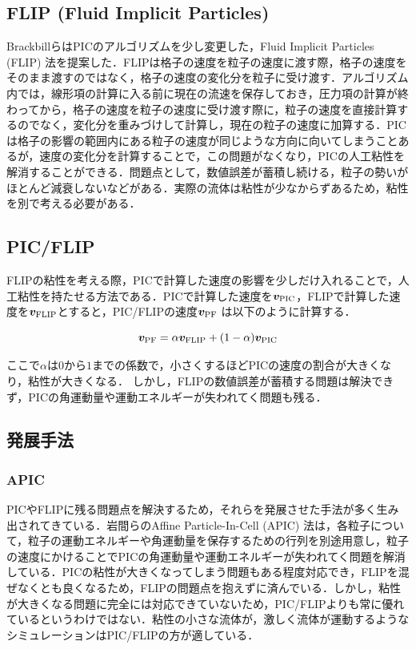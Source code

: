 \documentclass[a4j,12pt]{jreport}
\begin{document}
\subsection{FLIP (Fluid Implicit Particles) } \label{subsec:FLIP}
BrackbillらはPICのアルゴリズムを少し変更した，Fluid Implicit Particles (FLIP) 法\cite{FLIP}を提案した．FLIPは格子の速度を粒子の速度に渡す際，格子の速度をそのまま渡すのではなく，格子の速度の変化分を粒子に受け渡す．アルゴリズム内では，線形項の計算に入る前に現在の流速を保存しておき，圧力項の計算が終わってから，格子の速度を粒子の速度に受け渡す際に，粒子の速度を直接計算するのでなく，変化分を重みづけして計算し，現在の粒子の速度に加算する．PICは格子の影響の範囲内にある粒子の速度が同じような方向に向いてしまうことあるが，速度の変化分を計算することで，この問題がなくなり，PICの人工粘性を解消することができる．問題点として，数値誤差が蓄積し続ける，粒子の勢いがほとんど減衰しないなどがある．実際の流体は粘性が少なからずあるため，粘性を別で考える必要がある．
\subsection{PIC/FLIP} \label{subsec:PIC/FLIP}
FLIPの粘性を考える際，PICで計算した速度の影響を少しだけ入れることで，人工粘性を持たせる方法である．PICで計算した速度を$\bm{v}_{\rm{PIC}}$，FLIPで計算した速度を$\bm{v}_{\rm{FLIP}}$とすると，PIC/FLIPの速度$\bm{v}_{\rm{PF}}$ は以下のように計算する．

\begin{equation}\label{eq:PIC/FLIP}
\bm{v}_{\rm{PF}} =\alpha \bm{v}_{\rm{FLIP}} + (1-\alpha)  \bm{v}_{\rm{PIC}}
\end{equation} 

ここで$\alpha$は$0$から$1$までの係数で，小さくするほどPICの速度の割合が大きくなり，粘性が大きくなる．
しかし，FLIPの数値誤差が蓄積する問題は解決できず，PICの角運動量や運動エネルギーが失われてく問題も残る．

\subsection{発展手法} \label{subsec:APIC/ASFLIP}
\subsubsection{APIC} \label{subsec:APIC}
PICやFLIPに残る問題点を解決するため，それらを発展させた手法が多く生み出されてきている．岩間らのAffine Particle-In-Cell (APIC) 法\cite{APIC}は，各粒子について，粒子の運動エネルギーや角運動量を保存するための行列を別途用意し，粒子の速度にかけることでPICの角運動量や運動エネルギーが失われてく問題を解消している．PICの粘性が大きくなってしまう問題もある程度対応でき，FLIPを混ぜなくとも良くなるため，FLIPの問題点を抱えずに済んでいる．しかし，粘性が大きくなる問題に完全には対応できていないため，PIC/FLIPよりも常に優れているというわけではない．粘性の小さな流体が，激しく流体が運動するようなシミュレーションはPIC/FLIPの方が適している．
\end{document}
